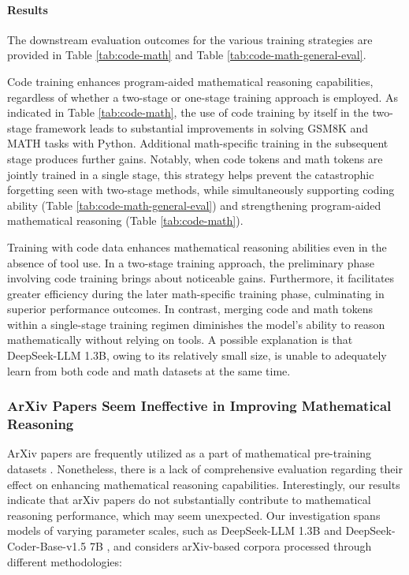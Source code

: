 \begin{itemize}[topsep=0pt]
\paragraph{Results}
The downstream evaluation outcomes for the various training strategies are provided in Table \ref{tab:code-math} and Table \ref{tab:code-math-general-eval}.

Code training enhances program-aided mathematical reasoning capabilities, regardless of whether a two-stage or one-stage training approach is employed. As indicated in Table \ref{tab:code-math}, the use of code training by itself in the two-stage framework leads to substantial improvements in solving GSM8K and MATH tasks with Python. Additional math-specific training in the subsequent stage produces further gains. Notably, when code tokens and math tokens are jointly trained in a single stage, this strategy helps prevent the catastrophic forgetting seen with two-stage methods, while simultaneously supporting coding ability (Table \ref{tab:code-math-general-eval}) and strengthening program-aided mathematical reasoning (Table \ref{tab:code-math}).

Training with code data enhances mathematical reasoning abilities even in the absence of tool use. In a two-stage training approach, the preliminary phase involving code training brings about noticeable gains. Furthermore, it facilitates greater efficiency during the later math-specific training phase, culminating in superior performance outcomes. In contrast, merging code and math tokens within a single-stage training regimen diminishes the model’s ability to reason mathematically without relying on tools. A possible explanation is that DeepSeek-LLM 1.3B, owing to its relatively small size, is unable to adequately learn from both code and math datasets at the same time.

\subsubsection{ArXiv Papers Seem Ineffective in Improving Mathematical Reasoning}

ArXiv papers are frequently utilized as a part of mathematical pre-training datasets \citep{minerva,gpt-f,llemma,mathpile}. Nonetheless, there is a lack of comprehensive evaluation regarding their effect on enhancing mathematical reasoning capabilities. Interestingly, our results indicate that arXiv papers do not substantially contribute to mathematical reasoning performance, which may seem unexpected. Our investigation spans models of varying parameter scales, such as DeepSeek-LLM 1.3B and DeepSeek-Coder-Base-v1.5 7B \citep{deepseek-coder}, and considers arXiv-based corpora processed through different methodologies:


\end{itemize}
